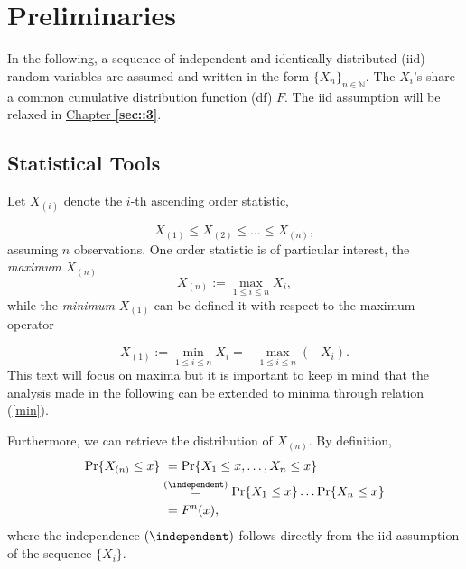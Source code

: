 
\section{Preliminaries}\label{sec::1.1}


In the following, a sequence of independent and identically distributed (iid) random variables are assumed and written in the form $\{X_n\}_{n\in\mathbb{N}}$. The $X_i$'s share a common cumulative distribution function (df) $F$. The iid assumption will be relaxed in \hyperref[sec::3]{Chapter \textbf{\ref{sec::3}}}.


\subsection*{Statistical Tools}

Let $X_{(i)} $ denote the $i$-th ascending order statistic,

\begin{equation} \label{ordereds}
X_{(1)}\leq X_{(2)}\leq \ldots \leq X_{(n)},
\end{equation}
assuming $n$ observations.
One order statistic is of particular interest, the \emph{maximum} $X_{(n)}$
\begin{equation} \label{max}
X_{(n)}:=\displaystyle{\max_{1\leq i\leq n}}X_i,
\end{equation}
while the \emph{minimum} $X_{(1)}$ can be defined it with respect to the maximum operator

\begin{equation}\label{min}
X_{(1)}:=\displaystyle{\min_{1\leq i\leq n}}X_i=- \displaystyle{\max_{1\leq i\leq n}}(-X_i).
\end{equation}
This text will focus on maxima but it is important to keep in mind that the analysis made in the following can be extended to minima through relation (\ref{min}).

Furthermore, we can retrieve the distribution of $X_{(n)}$. By definition,
\begin{equation}\label{maxdist}
\begin{aligned}
\text{Pr}\{X_{(n)}\leq x\} & \ =\text{Pr}\{X_1 \leq x, \ldots, X_n \leq x\} \\ &\stackrel{(\independent)}{=}\text{Pr}\{X_1\leq x\}\dots\text{Pr}\{X_n\leq x\} \\
&\ =F^n(x),
\end{aligned}
\end{equation}
where the independence $(\independent)$  follows directly from the iid assumption of the sequence $\{X_i\}$.


